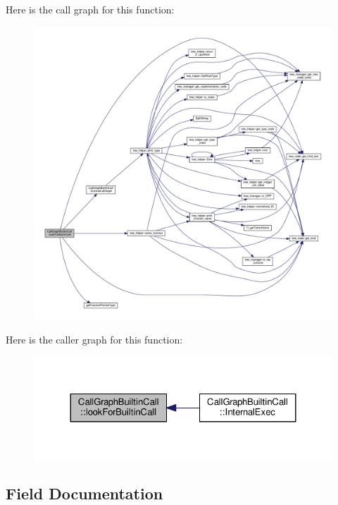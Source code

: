Here is the call graph for this function\+:
\nopagebreak
\begin{figure}[H]
\begin{center}
\leavevmode
\includegraphics[width=350pt]{d6/da0/classCallGraphBuiltinCall_a3c3f8ffb197a72edd1ea375b7ffa5d1d_cgraph}
\end{center}
\end{figure}
Here is the caller graph for this function\+:
\nopagebreak
\begin{figure}[H]
\begin{center}
\leavevmode
\includegraphics[width=324pt]{d6/da0/classCallGraphBuiltinCall_a3c3f8ffb197a72edd1ea375b7ffa5d1d_icgraph}
\end{center}
\end{figure}


\subsection{Field Documentation}
\mbox{\label{classCallGraphBuiltinCall_a7415263ac5a10f89975d1d8220c5b92b}} 
